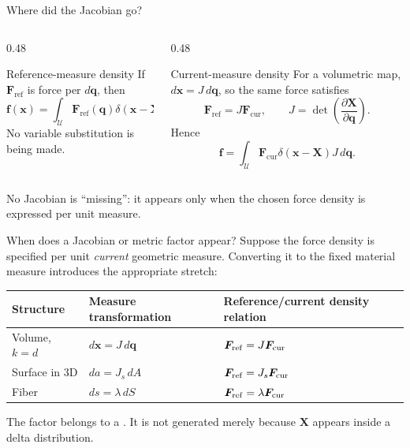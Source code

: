 \documentclass[aspectratio=169,11pt]{beamer}
\newcommand{\xvec}{\bm{x}}
\newcommand{\Xvec}{\bm{q}}
\newcommand{\chivec}{\bm{X}}
\newcommand{\fvec}{\bm{f}}
\newcommand{\Fvec}{\bm{F}}
\begin{document}
\begin{frame}{Where did the Jacobian go?}
\begin{columns}[T,onlytextwidth]
  \begin{column}{0.48\textwidth}
  \begin{block}{Reference-measure density}
  If \(\Fvec_{\mathrm{ref}}\) is force per \(d\Xvec\), then
  \[
    \fvec(\xvec)
    =\int_{\mathcal U}\Fvec_{\mathrm{ref}}(\Xvec)
    \delta(\xvec-\chivec(\Xvec))\,d\Xvec .
  \]
  No variable substitution is being made.
  \end{block}
  \end{column}
  \begin{column}{0.48\textwidth}
  \begin{block}{Current-measure density}
  For a volumetric map, \(d\xvec=J\,d\Xvec\), so the same force satisfies
  \[
    \Fvec_{\mathrm{ref}}=J\Fvec_{\mathrm{cur}},
    \qquad
    J=\det\!\left(\frac{\partial\chivec}{\partial\Xvec}\right).
  \]
  Hence
  \[
    \fvec=\int_{\mathcal U}\Fvec_{\mathrm{cur}}
    \delta(\xvec-\chivec)J\,d\Xvec .
  \]
  \end{block}
  \end{column}
\end{columns}

\begin{punchbox}
\centering
No Jacobian is ``missing'': it appears only when the chosen force density is expressed per unit  measure.
\end{punchbox}
\end{frame}

\begin{frame}{When does a Jacobian or metric factor appear?}
Suppose the force density is specified per unit \emph{current} geometric measure. Converting it to the fixed material measure introduces the appropriate stretch:

\begin{center}
\begin{tabular}{@{}lll@{}}
\toprule
Structure & Measure transformation & Reference/current density relation \\
\midrule
Volume, \(k=d\) & \(d\xvec=J\,d\Xvec\) & \(\Fvec_{\rm ref}=J\Fvec_{\rm cur}\) \\
Surface in 3D & \(da=J_s\,dA\) & \(\Fvec_{\rm ref}=J_s\Fvec_{\rm cur}\) \\
Fiber & \(ds=\lambda\,dS\) & \(\Fvec_{\rm ref}=\lambda\Fvec_{\rm cur}\) \\
\bottomrule
\end{tabular}
\end{center}

\begin{punchbox}
The factor belongs to a . It is not generated merely because \(\chivec\) appears inside a delta distribution.
\end{punchbox}
\end{frame}
\end{document}
